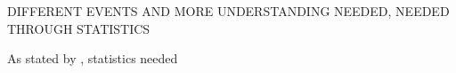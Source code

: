 \par 
DIFFERENT EVENTS AND MORE UNDERSTANDING NEEDED, NEEDED THROUGH STATISTICS

As stated by \cite{Bullock2007,Bogaert2010,Bredmose2009,Peregrine2003}, statistics needed

\newpage 

